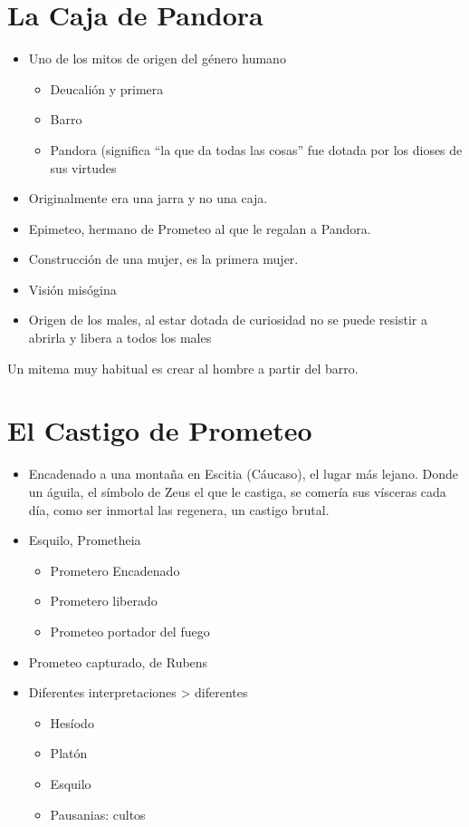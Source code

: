 \section{La Caja de Pandora}
\begin{itemize}
	\item Uno de los mitos de origen del género humano
	      \begin{itemize}
		      \item Deucalión y primera
		      \item Barro
		      \item Pandora (significa \enquote{la que da todas las cosas} fue dotada por los dioses de sus virtudes
	      \end{itemize}
	\item Originalmente era una jarra y no una caja.
	\item Epimeteo, hermano de Prometeo al que le regalan a Pandora.
	\item Construcción de una mujer, es la primera mujer.
	\item Visión misógina
	\item Origen de los males, al estar dotada de curiosidad no se puede resistir a abrirla y libera a todos los males
\end{itemize}

Un mitema muy habitual es crear al hombre a partir del barro.

\section{El Castigo de Prometeo}
\begin{itemize}
	\item Encadenado a una montaña en Escitia (Cáucaso), el lugar más lejano. Donde un águila, el símbolo de Zeus el que le castiga, se comería sus vísceras cada día, como ser inmortal las regenera, un castigo brutal.
	\item Esquilo, Prometheia
	      \begin{itemize}
		      \item Prometero Encadenado
		      \item Prometero liberado
		      \item Prometeo portador del fuego
	      \end{itemize}
	\item Prometeo capturado, de Rubens
	\item Diferentes interpretaciones > diferentes
	      \begin{itemize}
		      \item Hesíodo
		      \item Platón
		      \item Esquilo
		      \item Pausanias: cultos
	      \end{itemize}
\end{itemize}

